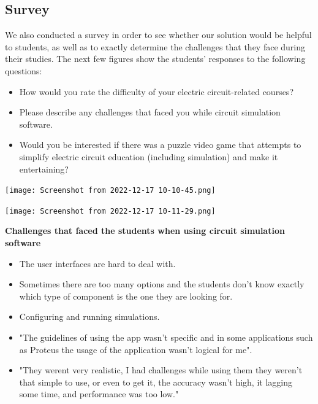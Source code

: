 \documentclass[twoside,a4paper,11pt]{article}
\begin{document}
\begin{multicols}{2}
\subsection{Survey}
We also conducted a survey in order to see whether our solution would be helpful to students, as well as to exactly determine the challenges that they face during their studies. The next few figures show the students' responses to the following questions:
\begin{itemize}
    \item How would you rate the difficulty of your electric circuit-related courses?
    \item Please describe any challenges that faced you while circuit simulation software.
    \item Would you be interested if there was a puzzle video game that attempts to simplify electric circuit education (including simulation) and make it entertaining? 
\end{itemize} 
\begin{center}
    \texttt{[image: Screenshot from 2022-12-17 10-10-45.png]}
\end{center}

\begin{center}
    \texttt{[image: Screenshot from 2022-12-17 10-11-29.png]}
\end{center}

\raggedright\textbf{Challenges that faced the students when using circuit simulation software}
\begin{itemize}
    \item The user interfaces are hard to deal with.
    \item Sometimes there are too many options and the students don't know exactly which type of component is the one they are looking for.
    \item Configuring and running simulations.
    \item "The guidelines of using the app wasn't specific and in some applications such as Proteus the usage of the application wasn't logical for me". 
    \item "They werent very realistic, I had challenges while using them they weren't that simple to use, or even to get it, the accuracy wasn't high, it lagging some time, and performance was too low."
\end{itemize}


\end{multicols}
\end{document}
